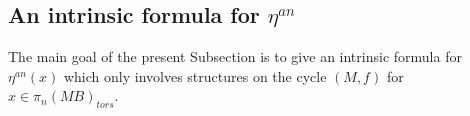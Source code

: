 \documentclass[12pt]{article}
\newcommand{\Z}{{\mathbb{Z}}}
\newcommand{\R}{{\mathbb{R}}}
\newcommand{\Td}{{\mathbf{Td}}}
\newcommand{\pr}{{\tt pr}}
\begin{document}
\subsection{An intrinsic formula for $\eta^{an}$}\label{intr1z}

 The main goal of the present Subsection is to give an intrinsic formula for $\eta^{an}(x)$ which only involves structures on the cycle  $(M,f)$ for $x\in \pi_{n}(MB)_{tors}$. %
% 
\end{document}
